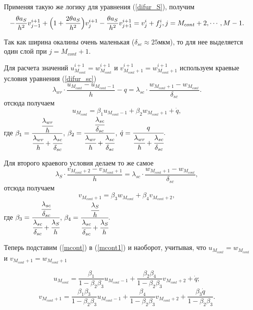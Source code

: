 Применяя такую же логику для уравнения (\ref{difur_S}), получим
\begin{equation}
-\frac{\theta a_S}{h^2}v_{j-1}^{i+1} + \Bigl(1 + \frac{2\theta a_S}{h^2}\Bigr)v_{j}^{i+1}-\frac{\theta a_S}{h^2}v_{j+1}^{i+1} = v_{j}^{i} + f_{j}^{i}, j=M_{cont}+2,\cdots, M-1.
\label{schema_S}
\end{equation}

Так как ширина окалины очень маленькая ($\delta_{sc} \approx 25 \text{мкм}$), то для нее выделяется один слой при $j = M_{cont} + 1$.

Для расчета значений $u_{M_{cont}}^{i+1} = w_{M_{cont}}^{i+1}$ и $v_{M_{cont} + 1}^{i+1} = w_{M_{cont} + 1}^{i+1}$ используем краевые условия уравнения (\ref{difur_sc})
$$\lambda_{wr} \cdot \frac{u_{M_{cont}} - u_{M_{cont} - 1}}{h} - q = \lambda_{sc} \cdot \frac{w_{M_{cont} + 1} - w_{M_{cont}}}{\delta_{sc}}.$$
отсюда получаем
\begin{equation}
u_{M_{cont}} = \beta_1 u_{M_{cont} - 1} + \beta_2 w_{M_{cont} + 1} + \dot q,
\label{mcont}
\end{equation}
где 
$\beta_1 = \cfrac{\cfrac{\lambda_{wr}}{h}}{\cfrac{\lambda_{wr}}{h} + \cfrac{\lambda_{sc}}{\delta_{sc}}}$, 
$\beta_2 = \cfrac{
					\cfrac{\lambda_{sc}}
				 		  {\delta_{sc}}
				 }
				 {
				 	\cfrac{\lambda_{wr}}
				 		  {h} + 
				  	\cfrac{\lambda_{sc}}
				  	      {\delta_{sc}}
			     }$, 
$\dot q = \cfrac{q}
				{
					\cfrac{\lambda_{wr}}
						  {h} + 
					\cfrac{\lambda_{sc}}{\delta_{sc}}
				}.$


Для второго краевого условия делаем то же самое
$$\lambda_{S} \cdot \frac{v_{M_{cont} + 2} - v_{M_{cont} + 1}}{h} = \lambda_{sc} \cdot \frac{w_{M_{cont} + 1} - w_{M_{cont}}}{\delta_{sc}},$$
отсюда получаем
\begin{equation}
v_{M_{cont} + 1} = \beta_3 w_{M_{cont}} + \beta_4 v_{M_{cont} + 2},
\label{mcont1}
\end{equation}
где $\beta_3 = \cfrac{\cfrac{\lambda_{sc}}{\delta_{sc}}}{\cfrac{\lambda_{sc}}{\delta_{sc}} + \cfrac{\lambda_{S}}{h}}$, $\beta_4 = \cfrac{\cfrac{\lambda_{S}}{h}}{\cfrac{\lambda_{sc}}{\delta_{sc}} + \cfrac{\lambda_{S}}{h}}.$

Теперь подставим (\ref{mcont}) в (\ref{mcont1}) и наоборот, учитывая, что $u_{M_{cont}} = w_{M_{cont}}$ и $v_{M_{cont} + 1} = w_{M_{cont} + 1}$

\begin{equation}
u_{M_{cont}} = \frac{\beta_1}{1-\beta_2 \beta_3} u_{M_{cont} - 1} + \frac{\beta_2 \beta_4}{1-\beta_2 \beta_3} v_{M_{cont} + 2} + \dot q;
\label{mcont_end}
\end{equation}
\begin{equation}
v_{M_{cont} + 1} = \frac{\beta_1 \beta_3}{1-\beta_2 \beta_3} u_{M_{cont} - 1} + \frac{\beta_4}{1-\beta_2 \beta_3} v_{M_{cont} + 2} + \frac{\beta_3 \dot q}{1-\beta_2 \beta_3}.
\label{mcont1_end}
\end{equation}

